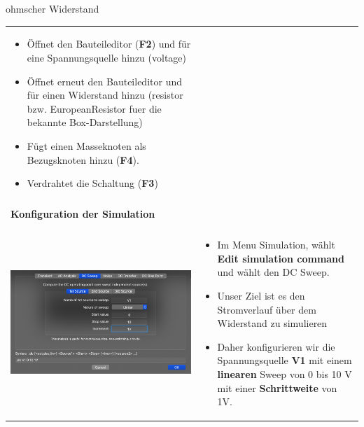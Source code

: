 \begin{frame}[t]{ohmscher Widerstand}
\begin{spacing}{0.9}
\begin{tiny}
\begin{table}[h!]
\begin{tabular}{p{3cm} p{7cm}}
\begin{minipage}{.7\textwidth}
\begin{itemize}
              \item Öffnet den Bauteileditor (\textbf{F2}) und für eine Spannungsquelle hinzu (voltage)
              \item Öffnet erneut den Bauteileditor und für einen Widerstand hinzu (resistor bzw. EuropeanResistor fuer die bekannte Box-Darstellung)
              \item Fügt einen Masseknoten als Bezugsknoten hinzu (\textbf{F4}).
              \item Verdrahtet die Schaltung (\textbf{F3})
            \end{itemize}
          \end{minipage}
          \\
                                                & \\
          \hline
          \textbf{Konfiguration der Simulation} & \\
          \hline                                  \\
          \begin{minipage}{.3\textwidth}
            \includegraphics[width=\linewidth]{pictures/simulationcmd_1.png}
          \end{minipage}
                                                &
          \begin{minipage}{.7\textwidth}
            \begin{itemize}
              \item Im Menu Simulation, wählt \textbf{Edit simulation command} und wählt den DC Sweep.
              \item Unser Ziel ist es den Stromverlauf über dem Widerstand zu simulieren
              \item Daher konfigurieren wir die Spannungsquelle \textbf{V1} mit einem \textbf{linearen} Sweep von 0 bis 10 V mit einer \textbf{Schrittweite} von 1V.

\end{itemize}
\end{minipage}
\end{tabular}
\end{table}
\end{tiny}
\end{spacing}
\end{frame}
